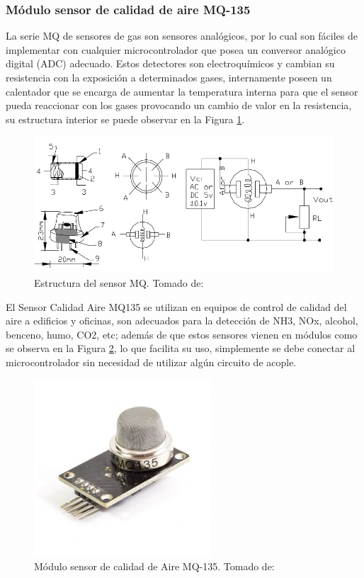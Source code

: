 \subsubsection{Módulo sensor de calidad de aire MQ-135}

La serie MQ de sensores de gas son sensores analógicos, por lo cual son fáciles de implementar con cualquier microcontrolador que posea un conversor analógico digital (ADC) adecuado. Estos detectores son electroquímicos y cambian su resistencia con la exposición a determinados gases, internamente poseen un calentador que se encarga de aumentar la temperatura interna para que el sensor pueda reaccionar con los gases provocando un cambio de valor en la resistencia, su estructura interior se puede observar en la Figura \ref{fig:estructura-del-sensor-mq}.\cite{MQ1}

\begin{figure}[H]
	\centering
	\caption[Estructura del sensor MQ.]{Estructura del sensor MQ. Tomado de: \cite{MQ1}}
	\label{fig:estructura-del-sensor-mq}
	\includegraphics[width=0.7\linewidth]{Imagenes/Estructura_del_sensor_MQ}
\end{figure}

El Sensor Calidad Aire MQ135 se utilizan en equipos de control de calidad del aire a edificios y oficinas, son adecuados para la detección de NH3, NOx, alcohol, benceno, humo, CO2, etc; además de que estos sensores vienen en módulos como se observa en la Figura \ref{fig:sensor-calidad-aire-mq135}, lo que facilita su uso, simplemente se debe conectar al microcontrolador sin necesidad de utilizar algún circuito de acople. \cite{MQ1}

\begin{figure}[H]
	\centering
	\caption[Módulo sensor de calidad de Aire MQ-135.]{Módulo sensor de calidad de Aire MQ-135. Tomado de: \cite{MQ1}}
	\label{fig:sensor-calidad-aire-mq135}
 	\includegraphics[width=0.35\linewidth]{Imagenes/sensor-calidad-aire-mq135}
\end{figure}

